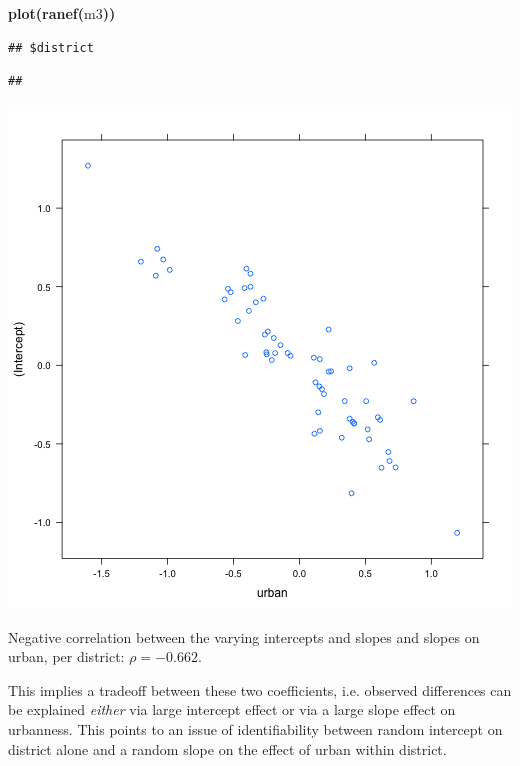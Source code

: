 \documentclass{article}
\makeatletter
\newcommand{\hlfunctioncall}[1]{\textcolor[rgb]{.5,0,.33}{\textbf{#1}}}%
\newcommand{\hlkeyword}[1]{\textbf{#1}}%
\newcommand{\hlsymbol}[1]{#1}%
\newcommand{\hlstd}[1]{\textcolor[rgb]{0,0,0}{#1}}%
\newenvironment{kframe}{%
 \def\FrameCommand##1{\hskip\@totalleftmargin \hskip-\fboxsep
 \colorbox{shadecolor}{##1}\hskip-\fboxsep
     \hskip-\linewidth \hskip-\@totalleftmargin \hskip\columnwidth}%
 \MakeFramed {\advance\hsize-\width
   \@totalleftmargin\z@ \linewidth\hsize
   \@setminipage}}%
 {\par\unskip\endMakeFramed}
\newenvironment{knitrout}{}{} %
\makeatother
\begin{document}
\begin{knitrout}
{\begin{kframe}
\begin{flushleft}
\ttfamily\noindent
\hspace*{\fill}\\
\hlstd{}\hspace*{\fill}\\
\hlstd{}\hlfunctioncall{plot}\hlkeyword{(}\hlfunctioncall{ranef}\hlkeyword{(}\hlsymbol{m3}\hlkeyword{)}\hlkeyword{)}\mbox{}
\normalfont
\end{flushleft}
\begin{verbatim}
## $district
\end{verbatim}
\begin{verbatim}
## 
\end{verbatim}
\includegraphics{urban-model} \end{kframe}}
\end{knitrout}


Negative correlation between the varying intercepts and slopes and slopes on urban, per district:  $\rho = - 0. 662$. 

This implies a tradeoff between these two coefficients, i.e. observed differences can be explained {\em either} via large intercept effect or via a large slope effect on urbanness. 
This points to an issue of identifiability between random intercept on district alone and a random slope on the effect of urban within district.
\end{document}
